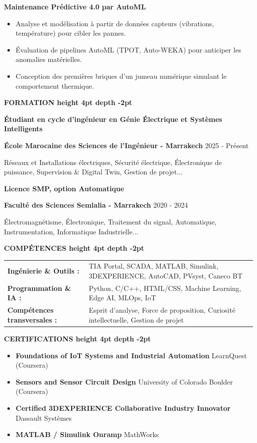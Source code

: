 \documentclass[10pt,a4paper]{altacv}
\renewcommand{\cvsection}[2][]{%
  \medskip%
  {\color{heading}\LARGE\bfseries #2 \hspace{0.2em}\leaders\vrule height 4pt depth -2pt\hfill\mbox{}}\par\smallskip
}
\renewcommand{\cvevent}[4]{%
  {\large\bfseries\color{accent}#1\par}
  \smallskip\normalsize
  \ifstrequal{#2}{}{}{%
    \textbf{\color{emphasis}#2\ifstrequal{#4}{}{}{ - #4}}%
  }%
  \hfill
  \ifstrequal{#3}{}{}{{\small#3}}%
  \par\smallskip
}
\begin{document}
{\large\bfseries\color{accent} Maintenance Prédictive 4.0 par AutoML}
\begin{itemize}
  \item Analyse et modélisation à partir de données capteurs (vibrations, température) pour cibler les pannes.
  \item Évaluation de pipelines AutoML (TPOT, Auto-WEKA) pour anticiper les anomalies matérielles.
  \item Conception des premières briques d'un jumeau numérique simulant le comportement thermique.
\end{itemize}

\cvsection{FORMATION}
\cvevent{Étudiant en cycle d'ingénieur en Génie Électrique et Systèmes Intelligents}{École Marocaine des Sciences de l'Ingénieur}{2025 - Présent}{Marrakech}
\small Réseaux et Installations électriques, Sécurité électrique, Électronique de puissance, Supervision \& Digital Twin, Gestion de projet...

\cvevent{Licence SMP, option Automatique}{Faculté des Sciences Semlalia}{2020 - 2024}{Marrakech}
\small Électromagnétisme, Électronique, Traitement du signal, Automatique, Instrumentation, Informatique Industrielle...

\cvsection{COMPÉTENCES}
\begin{tabular}{@{}ll@{}}
\textbf{Ingénierie \& Outils :} & TIA Portal, SCADA, MATLAB, Simulink, 3DEXPERIENCE, AutoCAD, PVsyst, Caneco BT \\[2pt]
\textbf{Programmation \& IA :} & Python, C/C++, HTML/CSS, Machine Learning, Edge AI, MLOps, IoT \\[2pt]
\textbf{Compétences transversales :} & Esprit d'analyse, Force de proposition, Curiosité intellectuelle, Gestion de projet \\
\end{tabular}

\cvsection{CERTIFICATIONS}
\begin{itemize}[leftmargin=*, label=\textbullet, itemsep=2pt]
  \item \textbf{Foundations of IoT Systems and Industrial Automation} \hfill {\color{emphasis}LearnQuest (Coursera)}
  \item \textbf{Sensors and Sensor Circuit Design} \hfill {\color{emphasis}University of Colorado Boulder (Coursera)}
  \item \textbf{Certified 3DEXPERIENCE Collaborative Industry Innovator} \hfill {\color{emphasis}Dassault Systèmes}
  \item \textbf{MATLAB / Simulink Onramp} \hfill {\color{emphasis}MathWorks}
\end{itemize}
\end{document}
